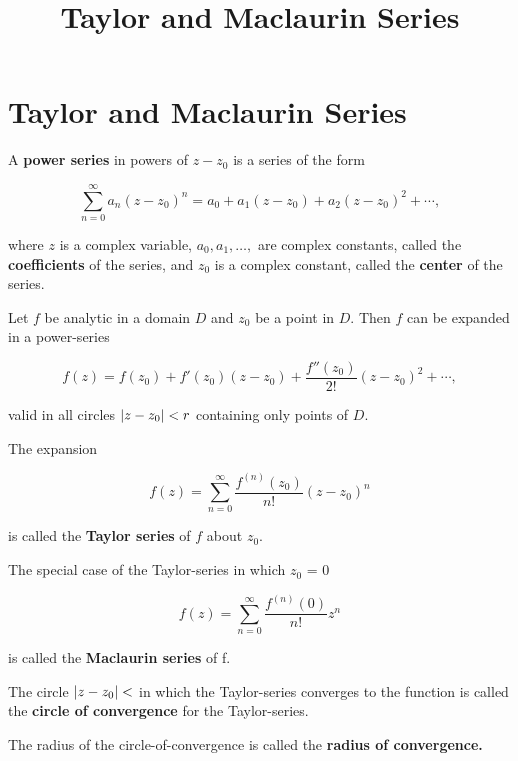 \documentclass{article}
\title{Taylor and Maclaurin Series}
\begin{document}
\section{Taylor and Maclaurin Series}

\begin{definition}
A \textbf{power series} in powers of $z - z_0$ is a series of the form

\[ \sum_{n=0}^{\infty} a_n (z - z_0)^n = a_0 + a_1(z - z_0) + a_2(z - z_0)^2 + \cdots, \]

where $z$ is a complex variable, $a_0, a_1, \dots,$ are complex constants, called the \textbf{coefficients} of the series, and $z_0$ is a complex constant, called the \textbf{center} of the series.
\end{definition}

\begin{theorem}\label{taylor-expansion-theorem}
Let $f$ be \@{analytic} in a \@{domain} $D$ and $z_0$ be a \@{point} in $D$. Then $f$ can be expanded in a \@{power-series}

\[ f(z) = f(z_0) + f'(z_0)(z - z_0) + \frac{f''(z_0)}{2!}(z - z_0)^2 + \cdots, \]

valid in all circles $\left| z - z_0 \right| < r$ containing only \@{points} of $D$.
\end{theorem}

\begin{definition}
The expansion

\[ f(z) = \sum_{n=0}^{\infty} \frac{f^{(n)}(z_0)}{n!} (z - z_0)^n \]

is called the \textbf{Taylor series} of $f$ about $z_0$.
\end{definition}

\begin{definition}
The special case of the \@{Taylor-series} in which $z_0$ = 0

\[ f(z) = \sum_{n=0}^{\infty} \frac{f^{(n)}(0)}{n!} z^n \]

is called the \textbf{Maclaurin series} of f.
\end{definition}

\begin{definition}
The circle $\left| z - z_0 \right| < $ in which the \@{Taylor-series} \@{converges} to the \@{function} is called the \textbf{circle of convergence} for the \@{Taylor-series}.
\end{definition}

\begin{definition}
The radius of the \@{circle-of-convergence} is called the \textbf{radius of convergence.}
\end{definition}
\end{document}
